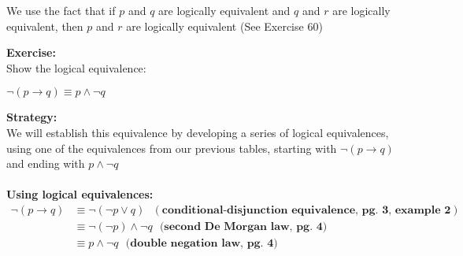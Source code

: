 \begin{tcolorbox}[colback=white, colframe=gray!60, title=Remark 1]
We use the fact that if $p$ and $q$ are logically equivalent and $q$ and $r$ are logically equivalent, then $p$ and $r$ are
logically equivalent (See Exercise 60)
\end{tcolorbox}

\begin{tcolorbox}[title=Example 1: Construct new logical equivalence]
\textbf{Exercise:}  
\\ Show the logical equivalence: 
\begin{center}
$\neg (p\rightarrow q) \equiv p \land \neg q$  
\end{center}

\textbf{Strategy:}  \\
We will establish this equivalence by developing a
series of logical equivalences, using one of the equivalences from our previous tables, starting with
$\neg (p\rightarrow q) $ and ending with $p \land \neg q$   \\ \\
\textbf{Using logical equivalences:}   
\begin{align*}
\neg (p\rightarrow q) &\equiv \neg (\neg p \lor q)  \ \ \ (\textbf{conditional-disjunction equivalence, pg. 3, example 2}) \\
&\equiv \neg (\neg p) \land \neg q \ \ \ \textbf{(second De Morgan law, pg. 4)} \\
&\equiv p\land \neg q \ \ \ \textbf{(double negation law, pg. 4)} \\
\end{align*}
\end{tcolorbox}

